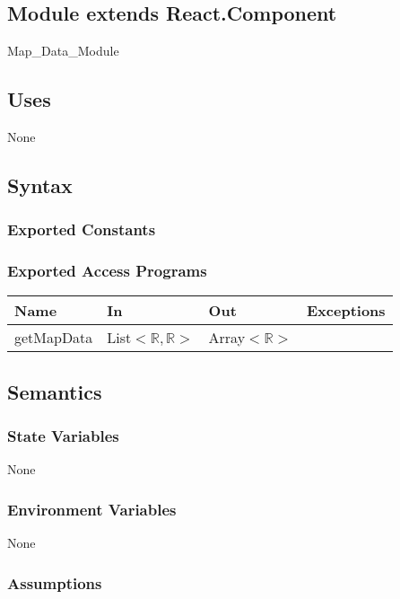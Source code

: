 \documentclass[12pt, titlepage]{article}
\begin{document}
\subsection{Module extends React.Component}

Map\_Data\_Module

\subsection{Uses}

None

\subsection{Syntax}

\subsubsection{Exported Constants}

\subsubsection{Exported Access Programs}

\begin{tabular}{| l | l | l | l |}
  \hline
  \textbf{Name} & \textbf{In} & \textbf{Out} & \textbf{Exceptions}\\
  \hline
  getMapData & List$<\mathbb{R},\mathbb{R}>$ & Array$<\mathbb{R}>$ & ~\\
  \hline
\end{tabular}

\subsection{Semantics}

\subsubsection{State Variables}

None

\subsubsection{Environment Variables}

None

\subsubsection{Assumptions}
\end{document}
